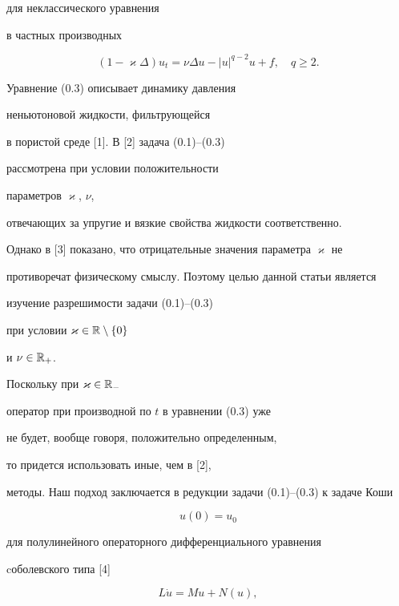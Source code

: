 для неклассического уравнения


в частных производных


\begin{equation}


(1 - \varkappa \Delta)u_{t} = \nu \Delta u -


| u | ^{q-2}u + f, \quad q \ge 2.\tag{0.3}


\end{equation}





Уравнение (0.3) описывает динамику давления 


неньютоновой жидкости, фильтрующейся


в пористой среде [1]. В [2] задача (0.1)--(0.3) 


рассмотрена при условии положительности


параметров $\varkappa$, $\nu$,


отвечающих за упругие и вязкие свойства жидкости соответственно.


Однако в [3] показано, что отрицательные значения параметра $\varkappa$ не


противоречат физическому смыслу. Поэтому целью данной статьи является


изучение разрешимости задачи (0.1)--(0.3) 


при условии $\varkappa \in {\Bbb R} \setminus \{ 0 \}$


и $\nu \in {\Bbb R}_{+}$.





Поскольку при $\varkappa \in {\Bbb R}_{-}$ 


оператор при производной по $t$ в уравнении (0.3) уже


не будет, вообще говоря, положительно определенным, 


то придется использовать иные, чем в [2],


методы. Наш подход заключается в редукции задачи (0.1)--(0.3) к задаче Коши


\begin{equation}


u(0) = u_0 \tag{0.4}


\end{equation}


для полулинейного операторного дифференциального уравнения 


cоболевского типа [4]


\begin{equation}


L\Dot u= Mu + N(u), \tag{0.5}


\end{equation}



